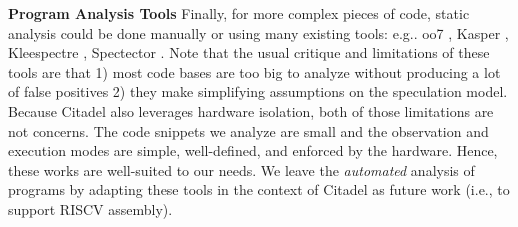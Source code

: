 \noindent\textbf{Program Analysis Tools}
Finally, for more complex pieces of code, static analysis could
be done manually or using many existing tools: e.g.. oo7 \cite{wang2019oo7}, Kasper \cite{johannesmeyer2022kasper}, Kleespectre \cite{wang2020kleespectre}, Spectector \cite{guarnieri2020spectector}.
Note that the usual critique and limitations of these tools are that 1) most code bases are too big to analyze without producing a lot of false positives 2) they make simplifying assumptions on the speculation model.
Because Citadel also leverages hardware isolation, both of those limitations are not concerns. The code snippets we analyze are small and the observation and execution modes are simple, well-defined, and enforced by the hardware.
Hence, these works are well-suited to our needs.
We leave the \textit{automated} analysis of programs by adapting these tools in the context of Citadel as future work (i.e., to support RISCV assembly).